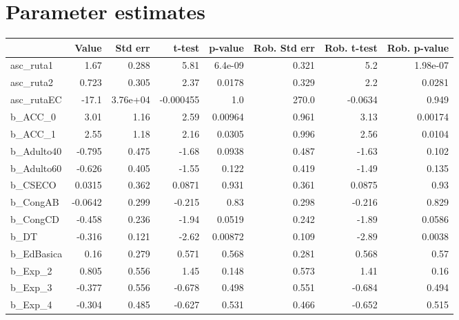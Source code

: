 \section{Parameter estimates}
\begin{tabular}{lrrrrrrr}
\toprule
{} &   Value &  Std err &    t-test &  p-value &  Rob. Std err &  Rob. t-test &  Rob. p-value \\
\midrule
asc\_ruta1     &    1.67 &    0.288 &      5.81 &  6.4e-09 &         0.321 &          5.2 &      1.98e-07 \\
asc\_ruta2     &   0.723 &    0.305 &      2.37 &   0.0178 &         0.329 &          2.2 &        0.0281 \\
asc\_rutaEC    &   -17.1 & 3.76e+04 & -0.000455 &      1.0 &         270.0 &      -0.0634 &         0.949 \\
b\_ACC\_0       &    3.01 &     1.16 &      2.59 &  0.00964 &         0.961 &         3.13 &       0.00174 \\
b\_ACC\_1       &    2.55 &     1.18 &      2.16 &   0.0305 &         0.996 &         2.56 &        0.0104 \\
b\_Adulto40    &  -0.795 &    0.475 &     -1.68 &   0.0938 &         0.487 &        -1.63 &         0.102 \\
b\_Adulto60    &  -0.626 &    0.405 &     -1.55 &    0.122 &         0.419 &        -1.49 &         0.135 \\
b\_CSECO       &  0.0315 &    0.362 &    0.0871 &    0.931 &         0.361 &       0.0875 &          0.93 \\
b\_CongAB      & -0.0642 &    0.299 &    -0.215 &     0.83 &         0.298 &       -0.216 &         0.829 \\
b\_CongCD      &  -0.458 &    0.236 &     -1.94 &   0.0519 &         0.242 &        -1.89 &        0.0586 \\
b\_DT          &  -0.316 &    0.121 &     -2.62 &  0.00872 &         0.109 &        -2.89 &        0.0038 \\
b\_EdBasica    &    0.16 &    0.279 &     0.571 &    0.568 &         0.281 &        0.568 &          0.57 \\
b\_Exp\_2       &   0.805 &    0.556 &      1.45 &    0.148 &         0.573 &         1.41 &          0.16 \\
b\_Exp\_3       &  -0.377 &    0.556 &    -0.678 &    0.498 &         0.551 &       -0.684 &         0.494 \\
b\_Exp\_4       &  -0.304 &    0.485 &    -0.627 &    0.531 &         0.466 &       -0.652 &         0.515 \\

\end{tabular}
